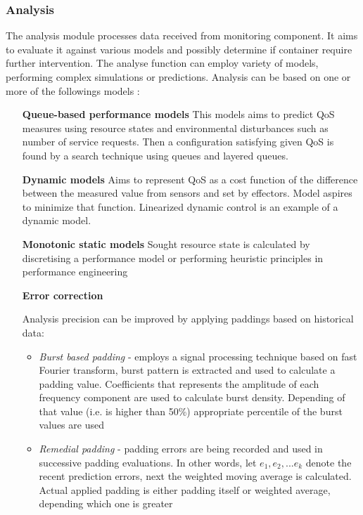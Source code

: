 \subsubsection{Analysis}
The analysis module processes data received from monitoring component. It aims to evaluate it against various models and possibly determine if container require further intervention. The analyse function can employ variety of models, performing complex simulations or predictions. Analysis can be based on one or more of the followings models \cite{LiWoZh05}:
\begin{itemize}
 \item[\textbf{Queue-based performance models}] This models aims to predict QoS measures using resource states and environmental disturbances such as number of service requests. Then a configuration satisfying given QoS is found by a search technique using queues and layered queues.
 
 \item[\textbf{Dynamic models}] Aims to represent QoS as a cost function of the difference between the measured value from sensors and set by effectors. Model aspires to minimize that function. Linearized dynamic control is an example of a dynamic model.
 
 \item[\textbf{Monotonic static models}] Sought resource state is calculated by discretising a performance model or performing heuristic principles in performance engineering
 
 \item[\textbf{Error correction}]
 
 Analysis precision can be improved by applying paddings based on historical data:
    \begin{itemize}
      \item \textit{Burst based padding} - employs a signal processing technique based on fast Fourier transform, burst pattern is extracted and used to calculate a padding value. Coefficients that represents the amplitude of each frequency component are used to calculate burst density. Depending of that value (i.e. is higher than 50\%) appropriate percentile of the burst values are used \cite{ShSuGuWi11}  
      \item \textit{Remedial padding} - padding errors are being recorded and used in successive padding evaluations. In other words, let $e_1, e_2, ... e_k$ denote the recent prediction errors, next the weighted moving average is calculated. Actual applied padding is either padding itself or weighted average, depending which one is greater \cite{ShSuGuWi11}    
    \end{itemize}


\end{itemize}
